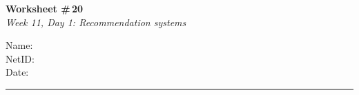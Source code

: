 \documentclass[11pt]{article}
\begin{document}
\noindent
\begin{minipage}[t]{0.55\textwidth}
  \vspace{0pt}
  {\LARGE \textbf{Worksheet \#\,20}} \\[0.3em]
  {\large \textit{Week 11, Day 1: Recommendation systems}}
\end{minipage}
\hfill
\begin{minipage}[t]{0.40\textwidth}
  \vspace{0pt}
  \begin{mdframed}[linecolor=black, linewidth=1pt, innertopmargin=10pt, innerbottommargin=10pt]
    \small
    \vspace{0.4cm}
    Name: \underline{\hspace{4.5cm}} \\[1em]
    NetID: \underline{\hspace{4.3cm}} \\[1em]
    Date: \underline{\hspace{4.4cm}} \\
  \end{mdframed}
\end{minipage}

\vspace{1em}
\noindent\rule{\linewidth}{1pt}
\vspace{0.2em}
\end{document}
